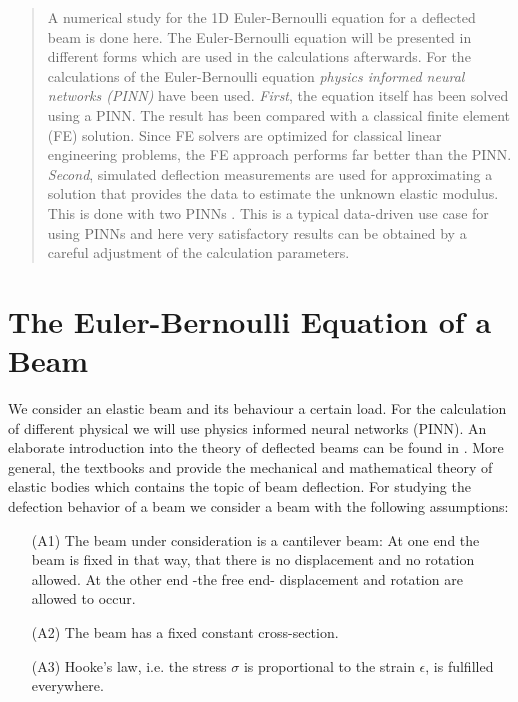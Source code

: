 \documentclass[a4paper,11pt]{article}
\begin{document}
\begin{abstract}
A numerical study for the 1D Euler-Bernoulli equation for a deflected beam is done here. The Euler-Bernoulli equation will be presented in different forms which are used in the calculations afterwards. For the calculations of the Euler-Bernoulli equation \emph{physics informed neural networks (PINN)} have been used. \emph{First}, the equation itself has been solved using a PINN. The result has been compared with a classical finite element (FE) solution. Since FE solvers are optimized for classical linear engineering problems, the FE approach performs far better than the PINN. \emph{Second}, simulated deflection measurements are used for approximating a solution that provides the data to estimate the unknown elastic modulus. This is done with two PINNs . This is a typical data-driven use case for using PINNs and here very satisfactory results can be obtained by a careful adjustment of the calculation parameters.
\end{abstract}

\tableofcontents
\newpage

\section{The Euler-Bernoulli Equation of a Beam}

We consider an elastic beam and its behaviour a certain load. For the calculation of different physical we will use physics informed neural networks (PINN). An elaborate introduction into the theory of deflected beams can be found in \cite[pp. 88]{gross2007mechanics}.
More general, the textbooks \cite{gross2007mechanics} and \cite[\S 5.10]{eck2008modellierung} provide the mechanical and mathematical theory of elastic bodies which contains the topic of beam deflection.
For studying the defection behavior of a beam we consider a beam with the following assumptions:
\begin{enumerate}
\item[(A1)] The beam under consideration is a cantilever beam: At one end the beam is fixed in that way, that there is no displacement and no rotation allowed. At the other end -the free end- displacement and rotation are allowed to occur.
\item[(A2)] The beam has a fixed constant cross-section.
\item[(A3)] Hooke's law, i.e. the stress $\sigma $ is proportional to the strain $\epsilon$, is fulfilled everywhere.
\end{enumerate}
\end{document}
